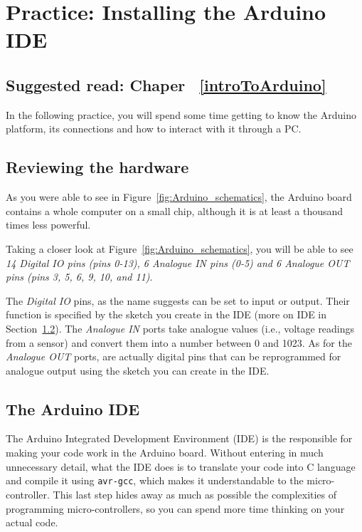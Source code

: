 \chapter{Practice: Installing the Arduino IDE}\label{pract:settingTheIDE}
\section*{Suggested read: Chaper~ \ref{introToArduino}}

In the following practice, you will spend some time getting to know the Arduino platform, its connections and how to interact with it through a PC.

\section{Reviewing the hardware}\label{pract:settingTheIDE:hardware}
As you were able to see in Figure~\ref{fig:Arduino_schematics}, the Arduino board contains a whole computer on a small chip, although it is at least a thousand times less powerful.

Taking a closer look at Figure~\ref{fig:Arduino_schematics}, you will be able to see \emph{14 Digital IO pins (pins 0-13), 6 Analogue IN pins (0-5) and 6 Analogue OUT pins (pins 3, 5, 6, 9, 10, and 11)}.

The \emph{Digital IO} pins, as the name suggests can be set to input or output. Their function is specified by the sketch you create in the IDE (more on IDE in Section~\ref{pract:settingTheIDE:IDE}). The \emph{Analogue IN} ports take analogue values (i.e., voltage readings from a sensor) and convert them into a number between 0 and 1023. As for the \emph{Analogue OUT} ports, are actually digital pins that can be reprogrammed for analogue output using the sketch you can create in the IDE.

\section{The Arduino IDE}\label{pract:settingTheIDE:IDE}
The Arduino Integrated Development Environment (IDE) is the responsible for making your code work in the Arduino board. Without entering in much unnecessary detail, what the IDE does is to translate your code into C language and compile it using \texttt{avr-gcc}, which makes it understandable to the micro-controller. This last step hides away as much as possible the complexities of programming micro-controllers, so you can spend more time thinking on your actual code.

